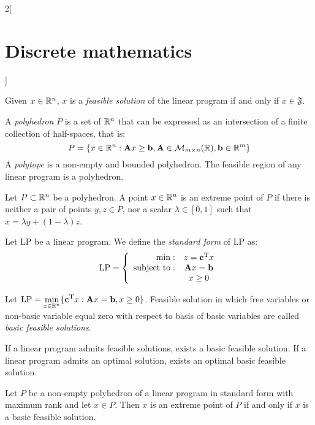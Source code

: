 \documentclass[../../../main.tex]{subfiles}
\begin{document}
\begin{multicols}{2}[\section{Discrete mathematics}]
\begin{definition}
  \end{definition}
  \begin{prop}
    Given $x\in\mathbb{R} ^n$, $x$ is a \emph{feasible solution} of the linear program if and only if $x\in\mathfrak{F}$.
  \end{prop}
  \begin{definition}
    A \emph{polyhedron} $P$ is a set of $\mathbb{R} ^n$ that can be expressed as an intersection of a finite collection of half-spaces, that is: $$P=\{x\in\mathbb{R} ^n:\boldsymbol{\mathrm{A}}x\geq \boldsymbol{\mathrm{b}}, \boldsymbol{\mathrm{A}}\in\mathcal{M}_{m\times n}(\mathbb{R} ),\boldsymbol{\mathrm{b}}\in\mathbb{R} ^m\}$$ A \emph{polytope} is a non-empty and bounded polyhedron. The feasible region of any linear program is a polyhedron.
  \end{definition}
  \begin{definition}
    Let $P\subset\mathbb{R} ^n$ be a polyhedron. A point $x\in\mathbb{R} ^n$ is an extreme point of $P$ if there is neither a pair of points $y,z\in P$, nor a scalar $\lambda\in[0,1]$ such that $x=\lambda y+(1-\lambda)z$.
  \end{definition}
  \begin{definition}
    Let LP be a linear program. We define the \emph{standard form} of LP as:
    $$\text{LP}=\left\{
      \begin{array}{rc}
        \min:              & z=\vb{c}^{\mathrm{T}}x \\
        \text{subject to}: & \boldsymbol{\mathrm{A}}x=\boldsymbol{\mathrm{b}}   \\
                           & x\geq 0
      \end{array}\right.$$
  \end{definition}
  \begin{definition}
    Let $\displaystyle \text{LP}=\min_{x\in\mathbb{R} ^n}\{\vb{c}^{\mathrm{T}}x:\boldsymbol{\mathrm{A}}x=\boldsymbol{\mathrm{b}},x\geq 0\}$. Feasible solution in which free variables or non-basic variable equal zero with respect to basis of basic variables are called \emph{basic feasible solutions}.
  \end{definition}
  \begin{prop}
    If a linear program admits feasible solutions, exists a basic feasible solution. If a linear program admits an optimal solution, exists an optimal basic feasible solution.
  \end{prop}
  \begin{theorem}
    Let $P$ be a non-empty polyhedron of a linear program in standard form with maximum rank and let $x\in P$. Then $x$ is an extreme point of $P$ if and only if $x$ is a basic feasible solution.
  \end{theorem}

\end{multicols}
\end{document}
